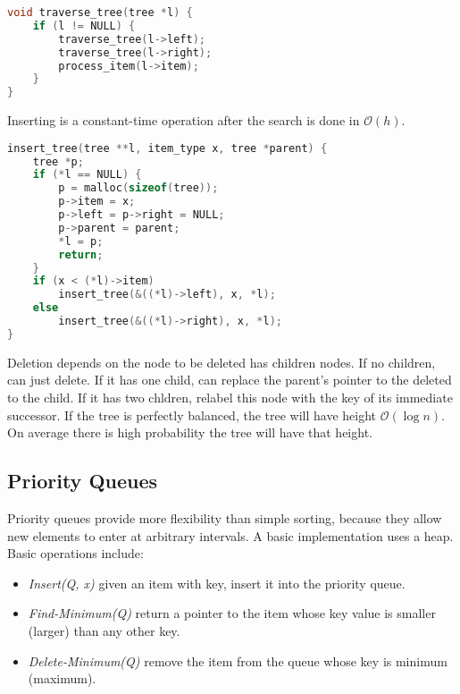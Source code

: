 \documentclass[10pt]{article}
\theoremstyle{definition}
\begin{document}
\begin{lstlisting}[language=C]
void traverse_tree(tree *l) {
    if (l != NULL) {
        traverse_tree(l->left);
        traverse_tree(l->right);
        process_item(l->item);
    }
}
\end{lstlisting}
Inserting is a constant-time operation after the search is done in $\mathcal{O}(h)$.
\begin{lstlisting}[language=C]
insert_tree(tree **l, item_type x, tree *parent) {
    tree *p;
    if (*l == NULL) {
        p = malloc(sizeof(tree));
        p->item = x;
        p->left = p->right = NULL;
        p->parent = parent;
        *l = p;
        return;
    }
    if (x < (*l)->item)
        insert_tree(&((*l)->left), x, *l);
    else
        insert_tree(&((*l)->right), x, *l);
}
\end{lstlisting}
Deletion depends on the node to be deleted has children nodes. If no children, can just delete. If it has one child, can replace the parent's pointer to the deleted to the child. If it has two chldren, relabel this node with the key of its immediate successor.
If the tree is perfectly balanced, the tree will have height $\mathcal{O}(\log n)$. On average there is high probability the tree will have that height. 

\subsection{Priority Queues}
Priority queues provide more flexibility than simple sorting, because they allow new elements to enter at arbitrary intervals. A basic implementation uses a heap. Basic operations include:
\begin{itemize}
    \item \textit{Insert(Q, x)} given an item with key, insert it into the priority queue.
    \item \textit{Find-Minimum(Q)} return a pointer to the item whose key value is smaller (larger) than any other key.
    \item \textit{Delete-Minimum(Q)} remove the item from the queue whose key is minimum (maximum).
\end{itemize}
\end{document}
